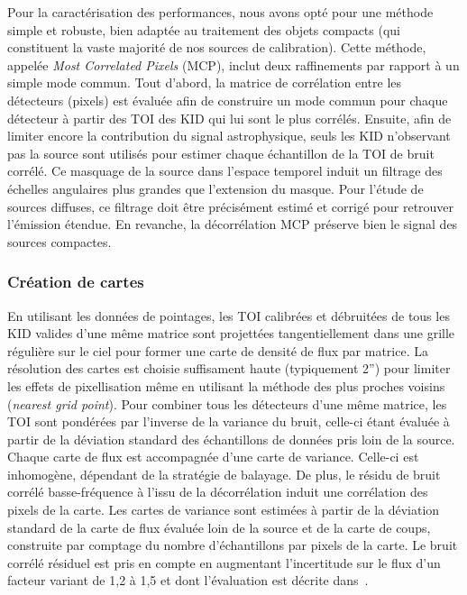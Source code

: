 Pour la caractérisation des performances, nous avons opté pour une
méthode simple et robuste, bien adaptée au traitement des objets
compacts (qui constituent la vaste majorité de nos sources de
calibration). Cette méthode, appelée \emph{Most Correlated Pixels} (MCP),
inclut deux raffinements par rapport à un simple mode commun. Tout
d'abord, la matrice de corrélation entre les détecteurs (pixels) est
évaluée afin de construire un mode commun pour chaque détecteur à
partir des TOI des KID qui lui sont le plus corrélés. Ensuite, afin de
limiter encore la contribution du signal astrophysique, seuls les KID
n'observant pas la source sont utilisés pour estimer chaque
échantillon de la TOI de bruit corrélé. Ce masquage de la source dans
l'espace temporel induit un filtrage des échelles angulaires plus
grandes que l'extension du masque. Pour l'étude de sources diffuses,
ce filtrage doit être précisément estimé et corrigé pour retrouver
l'émission étendue. En revanche, la décorrélation MCP préserve bien le
signal des sources compactes. 

\subsubsection{Création de cartes} En utilisant les données de
pointages, les TOI calibrées et débruitées de tous les KID valides
d'une même matrice sont projettées tangentiellement dans une grille
régulière sur le ciel pour former une carte de densité de flux par
matrice. La résolution des cartes est choisie suffisament haute
(typiquement 2'') pour limiter les effets de pixellisation
même en utilisant la méthode des plus proches voisins (\emph{nearest
  grid point}). Pour combiner tous les détecteurs d'une même matrice,
les TOI sont pondérées par l'inverse de la variance du bruit, celle-ci
étant évaluée à partir de la déviation standard des échantillons de
données pris loin de la source. Chaque carte de flux est accompagnée
d'une carte de variance. Celle-ci est inhomogène, dépendant de la
stratégie de balayage. De plus, le résidu de bruit corrélé
basse-fréquence à l'issu de la décorrélation induit une corrélation
des pixels de la carte. Les cartes de variance sont estimées à partir
de la déviation standard de la carte de flux évaluée loin de
la source et de la carte de coups, construite par comptage du
nombre d'échantillons par pixels de la carte. Le bruit corrélé
résiduel est pris en compte en augmentant l'incertitude sur le flux
d'un facteur variant de 1,2 à 1,5 et dont l'évaluation est décrite
dans~\citet{Perotto2019}.\\

